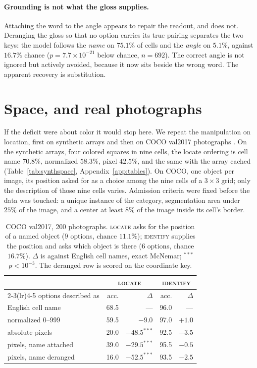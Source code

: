 \documentclass{article}
\begin{document}
\paragraph{Grounding is not what the gloss supplies.} Attaching the word to the
angle appears to repair the readout, and does not. Deranging the gloss so that no
option carries its true pairing separates the two keys: the model follows the
\emph{name} on $75.1\%$ of cells and the \emph{angle} on $5.1\%$, against $16.7\%$
chance ($p=7.7\times10^{-21}$ below chance, $n=692$). The correct angle is not
ignored but actively avoided, because it now sits beside the wrong word. The
apparent recovery is substitution.

\section{Space, and real photographs}
\label{sec:space}

If the deficit were about color it would stop here. We repeat the manipulation on
location, first on synthetic arrays and then on COCO val2017 photographs \citep{coco2014}. On the
synthetic arrays, four colored squares in nine cells, the locate ordering is cell
name $70.8\%$, normalized $58.3\%$, pixel $42.5\%$, and the same with the array
cached (Table~\ref{tab:synthspace}, Appendix~\ref{app:tables}). On COCO, one
object per image, its position asked for as a choice among the nine cells of a
$3\times3$ grid; only the description of those nine cells varies. Admission
criteria were fixed before the data was touched: a unique instance of the
category, segmentation area under $25\%$ of the image, and a center at least $8\%$
of the image inside its cell's border.

\begin{table}[t]
\centering
\caption{COCO val2017, 200 photographs. \textsc{locate} asks for the position of a
named object (9 options, chance $11.1\%$); \textsc{identify} supplies the position
and asks which object is there (6 options, chance $16.7\%$). $\Delta$ is against
English cell names, exact McNemar; ${}^{***}$ $p<10^{-3}$. The deranged row is
scored on the coordinate key.}
\label{tab:coco}
\begin{tabular}{lrrrr}
\toprule
& \multicolumn{2}{c}{\textsc{locate}} & \multicolumn{2}{c}{\textsc{identify}} \\
\cmidrule(lr){2-3}\cmidrule(lr){4-5}
options described as & acc. & $\Delta$ & acc. & $\Delta$ \\
\midrule
English cell name       & 68.5 & ---            & 96.0 & --- \\
normalized 0--999       & 59.5 & $-9.0$         & 97.0 & $+1.0$ \\
absolute pixels         & 20.0 & $-48.5^{***}$  & 92.5 & $-3.5$ \\
pixels, name attached   & 39.0 & $-29.5^{***}$  & 95.5 & $-0.5$ \\
pixels, name deranged   & 16.0 & $-52.5^{***}$  & 93.5 & $-2.5$ \\
\bottomrule
\end{tabular}
\end{table}
\end{document}

